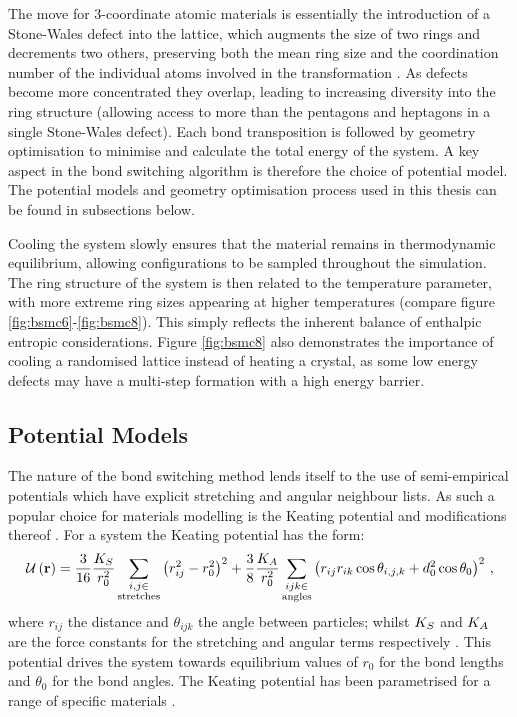 The \mc{} move for 3\--coordinate atomic materials is essentially the introduction of a Stone\--Wales defect into the lattice, which
augments the size of two rings and decrements two others, preserving both the mean ring size and the coordination number of the individual atoms involved in the transformation \cite{Stone1986}.
As defects become more concentrated they overlap, leading to increasing diversity into the ring structure (allowing access to more than the pentagons and heptagons in a single Stone\--Wales defect).
Each bond transposition is followed by geometry optimisation to minimise and calculate the total energy of the system.  
A key aspect in the bond switching algorithm is therefore the choice of potential model.
The potential models and geometry optimisation process used in this thesis can be found in subsections below.

Cooling the system slowly ensures that the material remains in thermodynamic equilibrium, allowing configurations to be sampled throughout the simulation.
The ring structure of the system is then related to the temperature parameter, with more extreme ring sizes appearing at higher temperatures (compare figure \ref{fig:bsmc6}\--\ref{fig:bsmc8}).
This simply reflects the inherent balance of enthalpic \vs{} entropic  considerations.
Figure \ref{fig:bsmc8} also demonstrates the importance of cooling a randomised lattice instead of heating a crystal, as some low energy defects may have a multi\--step formation with a high energy barrier.  

\subsection{Potential Models}

The nature of the bond switching method lends itself to the use of semi\--empirical potentials which have explicit stretching and angular neighbour lists.
As such a popular choice for materials modelling is the Keating potential and modifications thereof \cite{Keating1966,Barkema2000}. 
For a \td{} system the Keating potential has the form:
\begin{equation}
	\label{eq:keating}
	\mathcal{U}\left(\mathbf{r}\right) = \frac{3}{16}\frac{K_S}{r_0^2}\sum_{\substack{i,j \in \\ \text{stretches}}} \left(r_{ij}^2-r_0^2\right)^2+
	\frac{3}{8}\frac{K_A}{r_0^2}\sum_{\substack{ijk \in \\ \text{angles}}}\left(r_{ij}r_{ik}\cos\theta_{i,j,k}+d_0^2\cos\theta_0\right)^2 \,,
\end{equation}
where $r_{ij}$ the distance and $\theta_{ijk}$ the angle between particles; whilst $K_S$ and $K_A$ are the force constants for the stretching and angular terms respectively \cite{Kumar2012}.
This potential drives the system towards equilibrium values of $r_0$ for the bond lengths and $\theta_0$ for the bond angles.
The Keating potential has been parametrised for a range of specific materials \cite{Kumar2012,Drabold2009}. 

